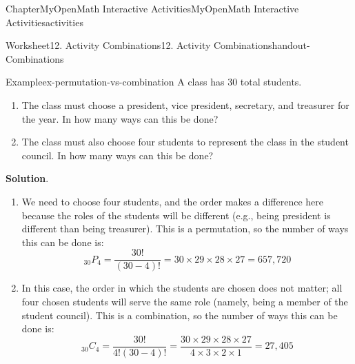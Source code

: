 \documentclass[oneside,10pt,]{book}
\newcommand{\blocktitlefont}{\relax}
\newlength{\fillinmaxwidth}
\newlength{\fillincontract}
\newlength{\charmaxwidth}\setlength{\charmaxwidth}{0.5em}
\newlength{\charminwidth}\setlength{\charminwidth}{0.1em}
\newlength{\fillinheight}
\newcommand{\fillintext}[1]{%
\setlength{\fillinmaxwidth}{#1\charmaxwidth}%
\setlength{\fillincontract}{#1\charminwidth}%
\setlength{\fillinheight}{\baselineskip}\addtolength{\fillinheight}{1.2pt}%
\strut\nobreak\leaders\vbox{\hrule width 0.3pt height 0.3pt \vskip -1.2pt}\hskip 1\fillinmaxwidth minus \fillincontract\nobreak\strut%
}
\begin{document}
\begin{chapterptx}{Chapter}{MyOpenMath Interactive Activities}{}{MyOpenMath Interactive Activities}{}{}{activities}
\begin{worksheet-section}{Worksheet}{12. Activity Combinations}{}{12. Activity Combinations}{}{}{handout-Combinations}
\begin{example}{Example}{}{ex-permutation-vs-combination}%
A class has \(30\) total students.%
\begin{enumerate}[label={\alph*}]
\item{}The class must choose a president, vice president, secretary, and treasurer for the year. In how many ways can this be done?%
\item{}The class must also choose four students to represent the class in the student council. In how many ways can this be done?%
\end{enumerate}
%
\par\smallskip%
\noindent\textbf{\blocktitlefont Solution}.\hypertarget{ex-permutation-vs-combination-2}{}\quad{}%
\begin{enumerate}[label={\alph*}]
\item{}We need to choose four students, and the order makes a difference here because the roles of the students will be different (e.g., being president is different than being treasurer). This is a permutation, so the number of ways this can be done is:%
\begin{equation*}
_{30}P_{4} = \frac{30!}{(30-4)!} = 30 \times 29 \times 28 \times 27 = 657,720
\end{equation*}
%
\item{}In this case, the order in which the students are chosen does not matter; all four chosen students will serve the same role (namely, being a member of the student council). This is a combination, so the number of ways this can be done is:%
\begin{equation*}
_{30}C_{4} = \frac{30!}{4!(30-4)!} = \frac{30 \times 29 \times 28 \times 27}{4 \times 3 \times 2 \times 1} = 27,405
\end{equation*}
%
\end{enumerate}
%
\end{example}
\end{worksheet-section}
\end{chapterptx}
\end{document}
